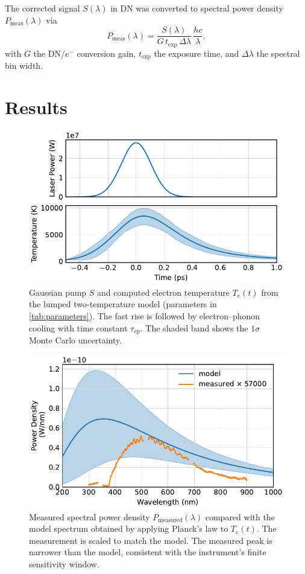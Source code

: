 \documentclass[
	parskip=half,
	a4paper,
]{scrarticle}
\begin{document}
The corrected signal \(S(\lambda)\) in DN was converted to spectral power density \(P_{\text{meas}}(\lambda)\) via
\begin{equation}
  P_{\text{meas}}(\lambda)
  = \frac{S(\lambda)}{G\,t_{\text{exp}}\,\Delta\lambda}\,\frac{hc}{\lambda},
\end{equation}
with \(G\) the DN/\(e^-\) conversion gain, \(t_{\text{exp}}\) the exposure time, and \(\Delta\lambda\) the spectral bin width.  


\section{Results}
\begin{figure}
    \centering
    \includegraphics{../analysis/figures/model te.pdf}
    \caption{Gaussian pump \(S\) and computed electron temperature \(T_e(t)\) from the lumped two-temperature model (parameters in \autoref{tab:parameters}). The fast rise is followed by electron–phonon cooling with time constant \(\tau_{\mathrm{ep}}\). The shaded band shows the \(1\sigma\) Monte Carlo uncertainty.}
    \label{fig:Te}
\end{figure}
\begin{figure}
    \centering
    \includegraphics{../analysis/figures/spectrum de.pdf}
    \caption{Measured spectral power density \(P_\text{measured}(\lambda)\) compared with the model spectrum obtained by applying Planck’s law to \(T_e(t)\). The measurement is scaled to match the model. The measured peak is narrower than the model, consistent with the instrument’s finite sensitivity window.}
    \label{fig:spectra}
\end{figure}
\end{document}
